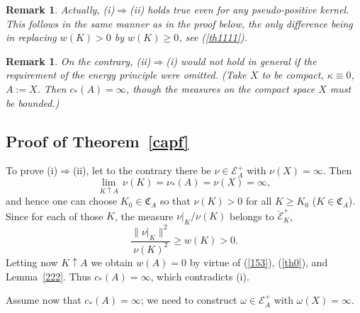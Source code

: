\documentclass[12pt,a4paper,reqno]{amsart} %
\theoremstyle{lause}
\theoremstyle{maaritelma}
\theoremstyle{lause}
\theoremstyle{maaritelma}
\newtheorem{remark}[theorem]{Remark}
\numberwithin{equation}{section}
\begin{document}
\begin{remark}\label{pseudo}
 Actually, (i)$\Rightarrow$(ii) holds true even for any pseu\-do-pos\-itive kernel. This follows in the same manner as in the proof below, the only difference being in replacing $w(K)>0$ by $w(K)\geqslant0$, see (\ref{th1111}).
\end{remark}

\begin{remark}\label{pseudo-no}
 On the contrary, (ii)$\Rightarrow$(i) would not hold in general if the requirement of the energy principle were omitted. (Take $X$ to be compact, $\kappa\equiv0$, $A:=X$. Then $c_*(A)=\infty$, though the measures on the compact space $X$ must be bounded.)
\end{remark}

\subsection{Proof of Theorem~\ref{capf}}\label{subs}
To prove (i)$\Rightarrow$(ii), let to the contrary there be $\nu\in\mathcal E^+_A$ with $\nu(X)=\infty$.
Then
\begin{equation}\label{th0}\lim_{K\uparrow A}\,\nu(K)=\nu_*(A)=\nu(X)=\infty,\end{equation}
and hence one can choose $K_0\in\mathfrak C_A$ so that $\nu(K)>0$ for all $K\geqslant K_0$ ($K\in\mathfrak C_A$).
Since for each of those $K$, the measure $\nu|_K/\nu(K)$ belongs to $\breve{\mathcal E}^+_K$,
\begin{equation}\label{th1111}\frac{\|\nu|_K\|^2}{\nu(K)^2}\geqslant w(K)>0.\end{equation}
Letting now $K\uparrow A$ we obtain $w(A)=0$ by virtue of (\ref{153}), (\ref{th0}), and Lemma~\ref{222}.
Thus $c_*(A)=\infty$, which contradicts (i).

Assume now that $c_*(A)=\infty$; we need to construct $\omega\in\mathcal E^+_A$ with $\omega(X)=\infty$.
\end{document}
